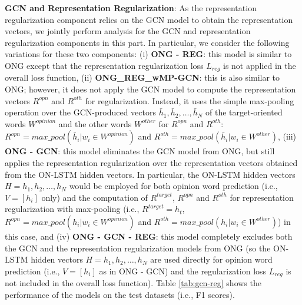 \documentclass[11pt,a4paper]{article}
\begin{document}
{\bf GCN and Representation Regularization}: As the representation regularization component relies on the GCN model to obtain the representation vectors, we jointly perform analysis for the GCN and representation regularization components in this part. In particular, we consider the following variations for these two components: (i) {\bf ONG - REG}: this model is similar to ONG except that the representation regularization loss $L_{reg}$ is not applied in the overall loss function, (ii) {\bf ONG\_REG\_wMP-GCN}: this is also similar to ONG; however, it does not apply the GCN model to compute the representation vectors $R^{opn}$ and $R^{oth}$ for regularization. Instead, it uses the simple max-pooling operation over the GCN-produced vectors $\bar{h}_1,\bar{h}_2,\ldots,\bar{h}_N$ of the target-oriented words $W^{opinion}$ and the other words $W^{other}$ for $R^{opn}$ and $R^{oth}$: $R^{opn} = max\_pool(\bar{h}_i|w_i \in W^{opinion})$ and $R^{oth} = max\_pool(\bar{h}_i|w_i \in W^{other})$, (iii) {\bf ONG - GCN}: this model eliminates the GCN model from ONG, but still applies the representation regularization over the representation vectors obtained from the ON-LSTM hidden vectors. In particular, the ON-LSTM hidden vectors $H=h_1,h_2,\ldots,h_N$ would be employed for both opinion word prediction (i.e., $V = [h_i]$ only) and the computation of $R^{target}$, $R^{opn}$ and $R^{oth}$ for representation regularization with max-pooling (i.e., $R^{target} = h_t$, $R^{opn} = max\_pool(h_i|w_i \in W^{opinion})$ and $R^{oth} = max\_pool(h_i|w_i \in W^{other})$) in this case, and (iv) {\bf ONG - GCN - REG}: this model completely excludes both the GCN and the representation regularization models from ONG (so the ON-LSTM hidden vectors $H=h_1,h_2,\ldots,h_N$ are used directly for opinion word prediction (i.e., $V = [h_i]$ as in ONG - GCN) and the regularization loss $L_{reg}$ is not included in the overall loss function). Table \ref{tab:gcn-reg} shows the performance of the models on the test datasets (i.e., F1 scores).
\begin{table}[ht]
\centering
    \caption{Performance of the variations of the GCN and representation regularization components.}
    \label{tab:gcn-reg}
\end{table}
\end{document}
